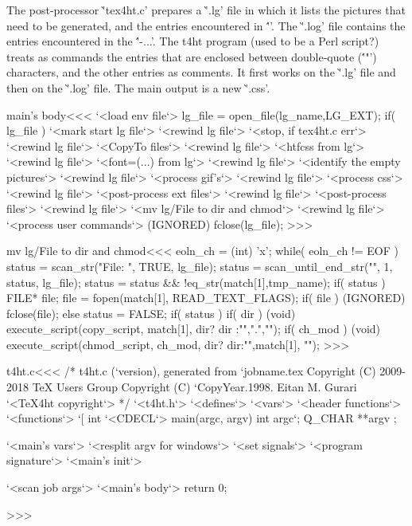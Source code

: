 The post-processor \`'tex4ht.c' prepares a \`'.lg' file in which it
lists the pictures that need to be generated, and the entries
encountered in \'''.  The \`'.log' file contains the entries
encountered in the \''\Needs-{...}'.  The t4ht program (used to be a
Perl script?) treats as commands the entries that are enclosed between
double-quote (\''"') characters, and the other entries as comments. It
first works on the \`'.lg' file and then on the \`'.log' file.
The main output is a new \`'.css'.


\<main's body\><<<
`<load env file`>
lg_file = open_file(lg_name,LG_EXT);
if( lg_file ) {
   `<mark start lg file`>
   `<rewind lg file`>  `<stop, if tex4ht.c err`>
   `<rewind lg file`>  `<CopyTo files`>
   `<rewind lg file`>  `<htfcss from lg`>
   `<rewind lg file`>  `<font=(...) from lg`>
   `<rewind lg file`>  `<identify the empty pictures`>
   `<rewind lg file`>  `<process gif's`>
   `<rewind lg file`>  `<process css`>
   `<rewind lg file`>  `<post-process ext files`>
   `<rewind lg file`>  `<post-process files`>
   `<rewind lg file`>  `<mv lg/File to dir and chmod`>
   `<rewind lg file`>  `<process user commands`>
   (IGNORED) fclose(lg_file);    
}
>>>

\<mv lg/File to dir and chmod\><<<
eoln_ch = (int) 'x';
while( eoln_ch != EOF ) {              
   status = scan_str("File: ", TRUE, lg_file);
   status = scan_until_end_str("", 1, status, lg_file);
   status = status && !eq_str(match[1],tmp_name);
   if( status ){
                    FILE* file;
     file = fopen(match[1], READ_TEXT_FLAGS);
     if( file ){
        (IGNORED) fclose(file);
     } else { status = FALSE; }
   }
   if( status ){
      if( dir ){                          
         (void) execute_script(copy_script, match[1], 
                               dir? dir :"",".","");
      }
      if( ch_mod ){
         (void) execute_script(chmod_script, ch_mod,
                               dir? dir:"",match[1], "");
      }
}  }
>>>

% 



\<t4ht.c\><<<
/* t4ht.c (`version), generated from `jobname.tex
   Copyright (C) 2009-2018 TeX Users Group
   Copyright (C) `CopyYear.1998. Eitan M. Gurari
`<TeX4ht copyright`> 
*/
`<t4ht.h`>
`<defines`>
`<vars`>
`<header functions`>
`<functions`>
`[
int `<CDECL`> main(argc, argv)
       int  argc`;  
       Q_CHAR **argv
;{ `<main's vars`> 
   `<resplit argv for windows`>
   `<set signals`>
   `<program signature`>
   `<main's init`> 

  `<scan job args`>
   `<main's body`>  
   return 0;
}
>>>


